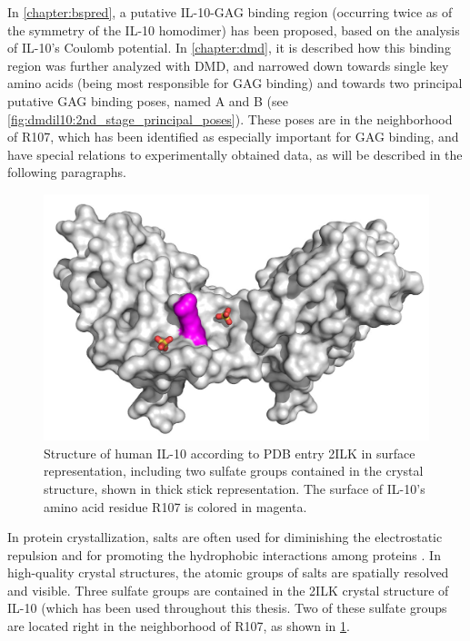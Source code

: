 In \cref{chapter:bspred}, a putative IL-10-GAG binding region (occurring twice
as of the symmetry of the IL-10 homodimer) has been proposed, based on the
analysis of IL-10's Coulomb potential. In \cref{chapter:dmd}, it is described
how this binding region was further analyzed with DMD, and narrowed down towards
single key amino acids (being most responsible for GAG binding) and towards two
principal putative GAG binding poses, named A and B (see
\cref{fig:dmdil10:2nd_stage_principal_poses}). These poses are in the
neighborhood of R107, which has been identified as especially important for GAG
binding, and have special relations to experimentally obtained data, as will be
described in the following paragraphs.

\begin{figure}
\centering
\includegraphics[width=1.0\textwidth]{gfx/together/il10sulfates_01.jpg}
\caption[]{
Structure of human IL-10 according to PDB entry 2ILK in surface representation,
including two sulfate groups contained in the crystal structure, shown in thick
stick representation. The surface of IL-10's amino acid residue R107 is colored
in magenta. }
\label{fig:together:il10sulfates}
\end{figure}

In protein crystallization, salts are often used for diminishing the
electrostatic repulsion and for promoting the hydrophobic interactions among
proteins \cite{crystal_salts_2001}. In high-quality crystal structures, the
atomic groups of salts are spatially resolved and visible. Three sulfate groups
are contained in the 2ILK crystal structure of IL-10 (which has been used
throughout this thesis. Two of these sulfate groups are located right in the
neighborhood of R107, as shown in \cref{fig:together:il10sulfates}.



